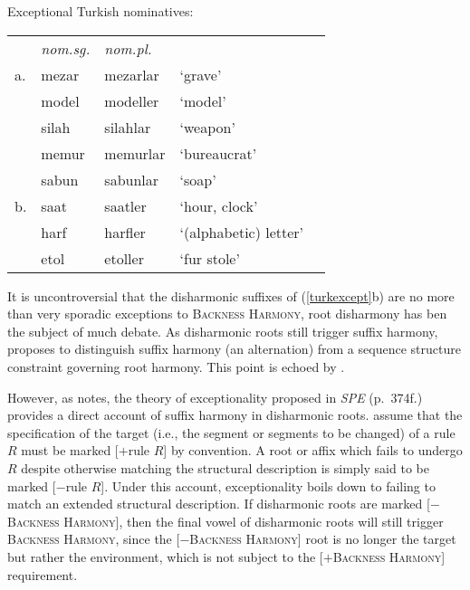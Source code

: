 \begin{example}
\label{turkexcept}
Exceptional Turkish nominatives:

\vspace{0.5\baselineskip}
\begin{tabular}{l l l l l}
   & \emph{nom.sg.} & \emph{nom.pl.} \\
a. & mezar          & mezarlar       & `grave' & \citep{TELL} \\
   & model          & modeller       & `model' \\
   & silah          & silahlar       & `weapon'     \\
   & memur          & memurlar       & `bureaucrat' \\
   & sabun          & sabunlar       & `soap'       \\
b. & saat           & saatler        & `hour, clock' \\
   & harf           & harfler        & `(alphabetic) letter' \\ %
   & etol           & etoller        & `fur stole' \\
\end{tabular}
\end{example}

It is uncontroversial that the disharmonic suffixes of (\ref{turkexcept}b) are no more than very sporadic exceptions to \textsc{Backness Harmony}, root disharmony has ben the subject of much debate. As disharmonic roots still trigger suffix harmony, \citet[][212, 289]{Anderson1974} proposes to distinguish suffix harmony (an alternation) from a sequence structure constraint governing root harmony. This point is echoed by \citet{Iverson1978}.

However, as \citet[][197f.]{Zonneveld1978} notes, the theory of exceptionality proposed in \emph{SPE} (p.~374f.) provides a direct account of suffix harmony in disharmonic roots. \citeauthor{SPE} assume that the specification of the target (i.e., the segment or segments to be changed) of a rule $R$ must be marked [$+$rule $R$] by convention. A root or affix which fails to undergo $R$ despite otherwise matching the structural description is simply said to be marked [$-$rule $R$]. Under this account, exceptionality boils down to failing to match an extended structural description. If disharmonic roots are marked [$-$\textsc{Backness Harmony}], then the final vowel of disharmonic roots will still trigger \textsc{Backness Harmony}, since the [$-$\textsc{Backness Harmony}] root is no longer the target but rather the environment, which is not subject to the [$+$\textsc{Backness Harmony}] requirement.

